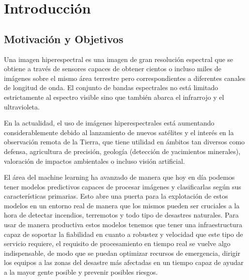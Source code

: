 \cleardoublepage


\chapter{Introducción}
\label{ch:chapter1}


\section{Motivación y Objetivos}

Una imagen hiperespectral es una imagen de gran resolución espectral que se obtiene a través de sensores capaces de obtener cientos o incluso miles de imágenes sobre el mismo área terrestre
pero correspondientes a diferentes canales de longitud de onda.
El conjunto de bandas espectrales no está limitado estrictamente al espectro visible sino que también abarca el infrarrojo y el ultravioleta.

En la actualidad, el uso de imágenes hiperespectrales está aumentando considerablemente debido al lanzamiento de nuevos satélites y el interés en la observación remota de la Tierra,
que tiene utilidad en ámbitos tan diversos como defensa, agricultura de precisión, geología (detección de yacimientos minerales), valoración de impactos ambientales o incluso visión artificial.

El área del machine learning ha avanzado de manera que hoy en día podemos tener modelos predictivos capaces de procesar imágenes y clasificarlas según sus características primarias.
Esto abre una puerta para la explotación de estos modelos en un entorno real de manera que los mismos pueden ser cruciales a la hora de detectar incendios, terremotos y todo tipo de
desastres naturales.
Para usar de manera productiva estos modelos tenemos que tener una infraestructura capaz de soportar la fiabilidad en cuanto a robustez y velocidad que este tipo de servicio requiere, el requisito de
procesamiento en tiempo real se vuelve algo indispensable, de modo que se puedan optimizar recursos de emergencia, dirigir los equipos a las zonas del desastre más afectadas en un tiempo
capaz de ayudar a la mayor gente posible y prevenir posibles riesgos.

